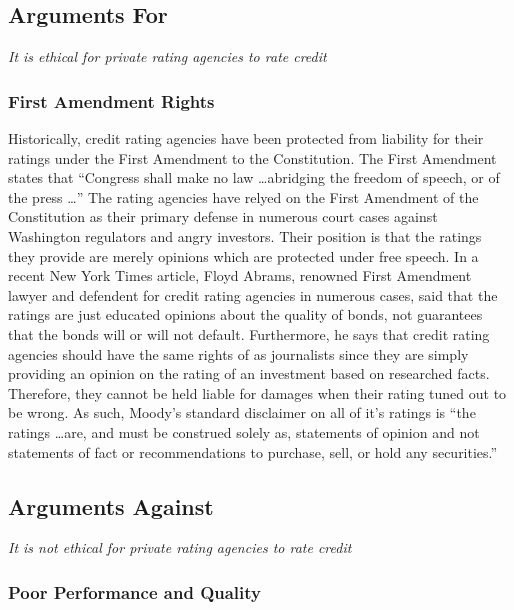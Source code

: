 \documentclass[11pt]{article}
\begin{document}
\begin{multicols}{2}
\subsection{Arguments For}

\textit{It is ethical for private rating agencies to rate credit}

\subsubsection{First Amendment Rights}

Historically, credit rating agencies have been protected from liability for their ratings under the First Amendment to the Constitution. \cite{CivilLiability} The First Amendment states that ``Congress shall make no law \ldots abridging the freedom of speech, or of the press \ldots'' \cite{firstAmendment}  The rating agencies have relyed on the First Amendment of the Constitution as their primary defense in numerous court cases against Washington regulators and angry investors. Their position is that the ratings they provide are merely opinions which are protected under free speech. \cite{CivilLiability, CRS} In a recent New York Times article, Floyd Abrams, renowned First Amendment lawyer and defendent for credit rating agencies in numerous cases, said that the ratings are just educated opinions about the quality of bonds, not guarantees that the bonds will or will not default.  Furthermore, he says that credit rating agencies should have the same rights of as journalists since they are simply providing an opinion on the rating of an investment based on researched facts.  Therefore, they cannot be held liable for damages when their rating tuned out to be wrong.  \cite{nyTimesFirstAmendment}  As such, Moody's standard disclaimer on all of it's ratings is ``the ratings \ldots are, and must be construed solely as, statements of opinion and not statements of fact or recommendations to purchase, sell, or hold any securities.'' \cite[p.120]{govtReport}


\subsection{Arguments Against}

\textit{It is not ethical for private rating agencies to rate credit}

\subsubsection{Poor Performance and Quality}


\end{multicols}
\end{document}
